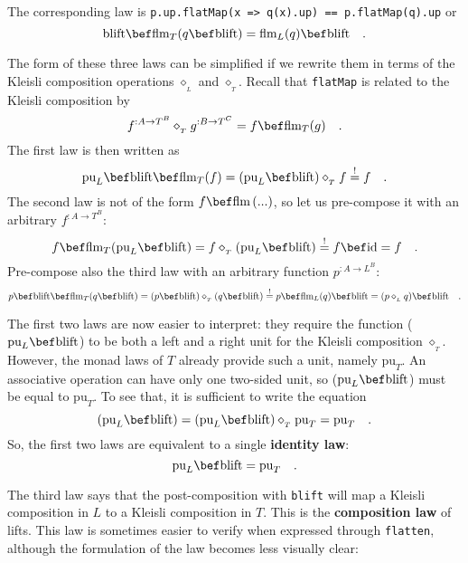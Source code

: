The corresponding law is \lstinline!p.up.flatMap(x => q(x).up) == p.flatMap(q).up!
or 
\[
\text{blift}\bef\text{flm}_{T}(q\bef\text{blift})=\text{flm}_{L}(q)\bef\text{blift}\quad.
\]

The form of these three laws can be simplified if we rewrite them
in terms of the Kleisli composition operations $\diamond_{_{L}}$
and $\diamond_{_{T}}$. Recall that \lstinline!flatMap! is related
to the Kleisli composition by
\[
f^{:A\rightarrow T^{B}}\diamond_{_{T}}g^{:B\rightarrow T^{C}}=f\bef\text{flm}_{T}(g)\quad.
\]
The first law is then written as
\[
\text{pu}_{L}\bef\text{blift}\bef\text{flm}_{T}(f)=(\text{pu}_{L}\bef\text{blift})\diamond_{_{T}}f\overset{!}{=}f\quad.
\]
The second law is not of the form $f\bef\text{flm}\left(...\right)$,
so let us pre-compose it with an arbitrary $f^{:A\rightarrow T^{B}}$:
\[
f\bef\text{flm}_{T}(\text{pu}_{L}\bef\text{blift})=f\diamond_{_{T}}(\text{pu}_{L}\bef\text{blift})\overset{!}{=}f\bef\text{id}=f\quad.
\]
Pre-compose also the third law with an arbitrary function $p^{:A\rightarrow L^{B}}$:
\[
p\bef\text{blift}\bef\text{flm}_{T}(q\bef\text{blift})=(p\bef\text{blift})\diamond_{_{T}}(q\bef\text{blift})\overset{!}{=}p\bef\text{flm}_{L}(q)\bef\text{blift}=(p\diamond_{_{L}}q)\bef\text{blift}\quad.
\]

The first two laws are now easier to interpret: they require the function
($\text{pu}_{L}\bef\text{blift}$) to be both a left and a right unit
for the Kleisli composition $\diamond_{_{T}}$. However, the monad
laws of $T$ already provide such a unit, namely $\text{pu}_{T}$.
An associative operation can have only one two-sided unit, so ($\text{pu}_{L}\bef\text{blift}$)
must be equal to $\text{pu}_{T}$. To see that, it is sufficient to
write the equation
\[
(\text{pu}_{L}\bef\text{blift})=(\text{pu}_{L}\bef\text{blift})\diamond_{_{T}}\text{pu}_{T}=\text{pu}_{T}\quad.
\]
So, the first two laws are equivalent to a single
\textbf{identity law}:
\[
\text{pu}_{L}\bef\text{blift}=\text{pu}_{T}\quad.
\]

The third law says that the post-composition with \lstinline!blift!
will map a Kleisli composition in $L$ to a Kleisli composition in
$T$. This is the \textbf{composition law}
of lifts. This law is sometimes easier to verify when expressed through
\lstinline!flatten!, although the formulation of the law becomes
less visually clear:%
\begin{comment}
precarious formatting
\end{comment}

